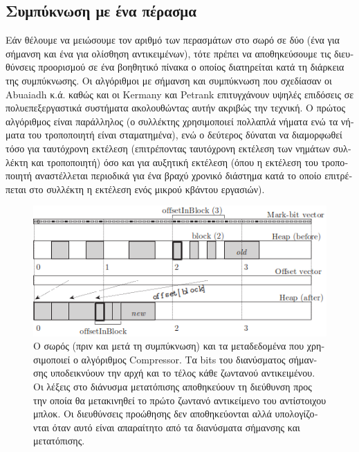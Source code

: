 \begin{greek}
\section{Συμπύκνωση με ένα πέρασμα}
Εάν θέλουμε να μειώσουμε τον αριθμό των περασμάτων στο σωρό σε δύο (ένα για 
σήμανση και ένα για ολίσθηση αντικειμένων), τότε πρέπει να αποθηκεύσουμε τις 
διευθύνσεις προορισμού σε ένα βοηθητικό πίνακα ο οποίος διατηρείται κατά τη 
διάρκεια της συμπύκνωσης. Οι αλγόριθμοι με σήμανση και συμπύκνωση που σχεδίασαν 
οι Abuaiadh κ.ά. \cite{DBLP:conf/oopsla/AbuaiadhOPS04} καθώς και οι Kermany και 
Petrank \cite{DBLP:conf/pldi/KermanyP06} επιτυγχάνουν υψηλές επιδόσεις σε 
πολυεπεξεργαστικά συστήματα ακολουθώντας αυτήν ακριβώς την τεχνική. Ο πρώτος 
αλγόριθμος είναι παράλληλος (ο συλλέκτης χρησιμοποιεί πολλαπλά νήματα ενώ τα 
νήματα του τροποποιητή είναι σταματημένα), ενώ ο δεύτερος δύναται να διαμορφωθεί 
τόσο για ταυτόχρονη εκτέλεση (επιτρέποντας ταυτόχρονη εκτέλεση των νημάτων 
συλλέκτη και τροποποιητή) όσο και για αυξητική εκτέλεση (όπου η εκτέλεση του
τροποποιητή αναστέλλεται περιοδικά για ένα βραχύ χρονικό διάστημα κατά το οποίο
επιτρέπεται στο συλλέκτη η εκτέλεση ενός μικρού κβάντου εργασιών). 

\begin{figure}
  \centering
  \includegraphics{figures/mrkcmp_2}
  \caption[Ο σωρός (πριν και μετά τη συμπύκνωση) και τα μεταδεδομένα
           που χρησιμοποιεί ο αλγόριθμος Compressor.]
    {Ο σωρός (πριν και μετά τη συμπύκνωση) και τα μεταδεδομένα
     που χρησιμοποιεί ο αλγόριθμος Compressor. Τα bits του διανύσματος
     σήμανσης υποδεικνύουν την αρχή και το τέλος κάθε ζωντανού
     αντικειμένου. Οι λέξεις στο διάνυσμα μετατόπισης αποθηκεύουν
     τη διεύθυνση προς την οποία θα μετακινηθεί το πρώτο ζωντανό
     αντικείμενο του αντίστοιχου μπλοκ. Οι διευθύνσεις προώθησης
     δεν αποθηκεύονται αλλά υπολογίζονται όταν αυτό είναι απαραίτητο
     από τα διανύσματα σήμανσης και μετατόπισης.}
  \label{fig:mrkcmp_2}
\end{figure}


\end{greek}
